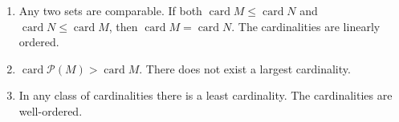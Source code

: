 \begin{enumerate}
\item[(a)] Any two sets are comparable. If both $\operatorname{card} M \leqslant \operatorname{card} N$ and $\operatorname{card} N \leqslant \operatorname{card} M$, then $\operatorname{card} M = \operatorname{card} N$. The cardinalities are linearly ordered.
\item[(b)] $\operatorname{card} \mathcal{P}(M) > \operatorname{card} M$. There does not exist a largest cardinality.
\item[(c)] In any class of cardinalities there is a least cardinality. The cardinalities are well-ordered.
\end{enumerate}
